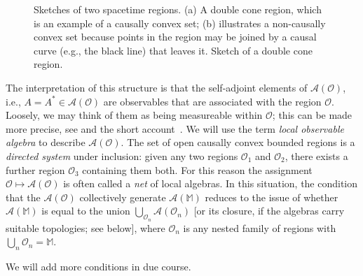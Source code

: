 \documentclass[12pt,a4paper]{article}
\newcommand{\1}{\mathds{1}}                         %
\newcommand{\Ocal}{\mathcal{O}}
\newcommand{\MM}{\mathbb{M}}
\newcommand{\Ac}{{\mathcal{A}}}
\begin{document}
\begin{figure}
	\begin{center}
	\end{center}\caption{Sketches of two spacetime regions. (a) A double cone region, which is an example of a causally convex set; (b) illustrates a non-causally convex set because points in the region may be joined by a causal curve (e.g., the black line) that leaves it.
		Sketch of a double cone region.}\label{fig:spacetimeregions}
\end{figure}
	The interpretation of this structure is that the self-adjoint elements of $\Ac(\Ocal)$,
	i.e., $A=A^*\in\Ac(\Ocal)$ are observables that are associated with the region $\Ocal$.
	Loosely, we may think of them as being measureable within $\Ocal$; this can be made more precise, see \cite{FV:2018} and the short account~\cite{Fewster:2019}. We will use the term \emph{local observable algebra} to describe $\Ac(\Ocal)$.
	The set of open causally convex bounded regions is a \emph{directed system} under inclusion: given any two regions $\Ocal_1$ and $\Ocal_2$, there exists a further region $\Ocal_3$ containing them both. For this reason the assignment $\Ocal\mapsto\Ac(\Ocal)$ is often called a \emph{net} of local algebras. In this situation, the condition that the $\Ac(\Ocal)$ collectively generate $\Ac(\MM)$ reduces to the issue of whether $\Ac(\MM)$ is equal to the union $\bigcup_{\Ocal_n}\Ac(\Ocal_n)$ [or its closure, if the algebras carry suitable topologies; see below], where $\Ocal_n$ is any nested family of regions with $\bigcup_n \Ocal_n=\MM$.
	
	We will add more conditions in due course.
\end{document}
